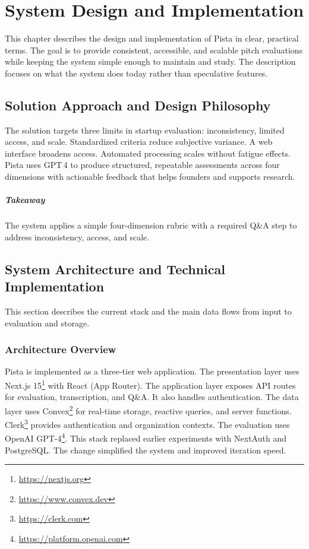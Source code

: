 \chapter{System Design and Implementation} \label{ch:problem-solution}

This chapter describes the design and implementation of Pista in clear, practical terms. The goal is to provide consistent, accessible, and scalable pitch evaluations while keeping the system simple enough to maintain and study. The description focuses on what the system does today rather than speculative features.

\section{Solution Approach and Design Philosophy} \label{sec:solution-approach}

The solution targets three limits in startup evaluation: inconsistency, limited access, and scale. Standardized criteria reduce subjective variance. A web interface broadens access. Automated processing scales without fatigue effects. Pista uses GPT\,4 to produce structured, repeatable assessments across four dimensions with actionable feedback that helps founders and supports research.

\paragraph{Takeaway} The system applies a simple four-dimension rubric with a required Q\&A step to address inconsistency, access, and scale.

\section{System Architecture and Technical Implementation} \label{sec:system-design}

This section describes the current stack and the main data flows from input to evaluation and storage.

\subsection{Architecture Overview}\label{subsec:architecture-overview}
Pista is implemented as a three-tier web application. The presentation layer uses Next.js 15\footnote{\url{https://nextjs.org}} with React (App Router). The application layer exposes API routes for evaluation, transcription, and Q\&A. It also handles authentication. The data layer uses Convex\footnote{\url{https://www.convex.dev}} for real-time storage, reactive queries, and server functions. Clerk\footnote{\url{https://clerk.com}} provides authentication and organization contexts. The evaluation uses OpenAI GPT-4\footnote{\url{https://platform.openai.com}}. This stack replaced earlier experiments with NextAuth and PostgreSQL. The change simplified the system and improved iteration speed.

